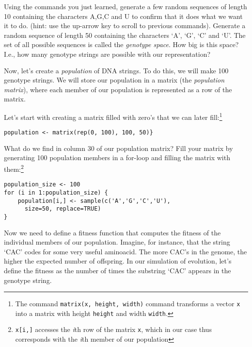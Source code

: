 \documentclass[a4paper, 9pt]{article}
\begin{document}
\begin{exercise}
    \action Using the commands you just learned, generate a few random sequences of length 10 containing the characters A,G,C and U to confirm that it does what we want it to do. (hint: use the up-arrow key to scroll to previous commands).
    \action Generate a random sequence of length 50 containing the characters `A', `G', `C' and `U'. 
    \askstar The set of all possible sequences is called the \textit{genotype space}. How big is this space? I.e., how many genotype strings are possible with our representation?
\end{exercise}

Now, let's create a \textit{population} of DNA strings. To do this, we
will make 100 genotype strings.
We will store our population in a matrix (the \textit{population matrix}), where each member of our population is represented as a row of the matrix. 

\begin{exercise}
\action Let's start with creating a matrix filled with zero's that we can later fill:\footnote{The command \texttt{matrix(x, height, width)} command transforms a vector \texttt{x} into a matrix with height \texttt{height} and width \texttt{width}.} 
  \begin{lstlisting}
population <- matrix(rep(0, 100), 100, 50)}
\end{lstlisting}
  
  \action What do we find in column 30 of our population matrix?
  \action Fill your matrix by generating 100 population members in a for-loop and filling the matrix with them:\footnote{\texttt{x[i,]} accesses the \textit{i}th row of the matrix \texttt{x}, which in our case thus corresponds with the \textit{i}th member of our population}
  \begin{lstlisting}
population_size <- 100
for (i in 1:population_size) {
    population[i,] <- sample(c('A','G','C','U'), 
      size=50, replace=TRUE)
}
    \end{lstlisting}
\end{exercise}

Now we need to define a fitness function that computes the fitness of
the individual members of our population. Imagine, for instance, that
the string `CAC' codes for some very useful aminoacid. The more CAC's in
the genome, the higher the expected number of offspring. In our
simulation of evolution, let's define the fitness as the number of times
the substring `CAC' appears in the genotype string.
\end{document}
